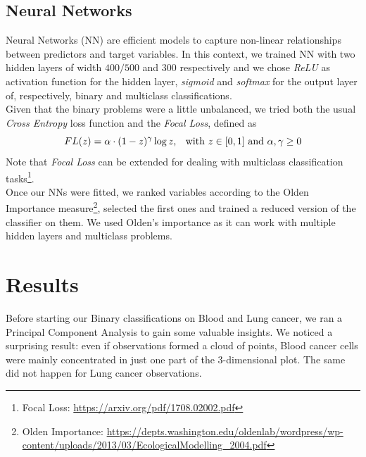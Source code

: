 \documentclass[a4paper,11pt, oneside]{article}  %
\begin{document}
	\subsection{Neural Networks}
	Neural Networks (NN) are efficient models to capture non-linear relationships between predictors and target variables. In this context, we trained NN with two hidden layers of width $400/500$ and $300$ respectively and we chose \textit{ReLU} as activation function for the hidden layer, \textit{sigmoid} and \textit{softmax} for the output layer of, respectively, binary and multiclass classifications. \\
	Given that the binary problems were a little unbalanced, we tried both the usual \textit{Cross Entropy} loss function and the \textit{Focal Loss}, defined as 
	\begin{equation*}
		FL(z) = \alpha \cdot (1 - z)^{\gamma} \log{z} \text{,  \hspace{3pt} with }z \in [0,1]  \text{ and } \alpha,  \gamma \geq 0
	\end{equation*}
	Note that \textit{Focal Loss} can be extended for dealing with multiclass classification tasks\footnote{Focal Loss: \url{https://arxiv.org/pdf/1708.02002.pdf}}. \\
	Once our NNs were fitted,  we ranked variables according to the Olden Importance measure\footnote{Olden Importance: \url{https://depts.washington.edu/oldenlab/wordpress/wp-content/uploads/2013/03/EcologicalModelling_2004.pdf}}, selected the first ones and trained a reduced version of the classifier on them. We used Olden's importance as it can work with multiple hidden layers and multiclass problems. 
	
	\section{Results}
	Before starting our Binary classifications on Blood and Lung cancer, we ran a Principal Component Analysis to gain some valuable insights. We noticed a surprising result: even if observations formed a cloud of points, Blood cancer cells were mainly concentrated in just one part of the 3-dimensional plot. The same did not happen for Lung cancer observations.
	
\end{document}
